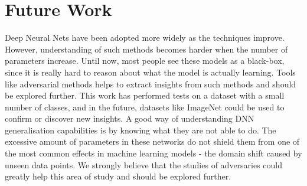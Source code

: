 \section{Future Work}

Deep Neural Nets have been adopted more widely as the techniques improve. However, understanding of such methods becomes harder when the number of parameters increase. Until now, most people see these models as a black-box, since it is really hard to reason about what the model is actually learning. Tools like adversarial methods helps to extract insights from such methods and should be explored further. This work has performed tests on a dataset with a small number of classes, and in the future, datasets like ImageNet could be used to confirm or discover new insights. A good way of understanding DNN generalisation capabilities is by knowing what they are not able to do. The excessive amount of parameters in these networks do not shield them from one of the most common effects in machine learning models - the domain shift caused by unseen data points. We strongly believe that the studies of adversaries could greatly help this area of study and should be explored further.